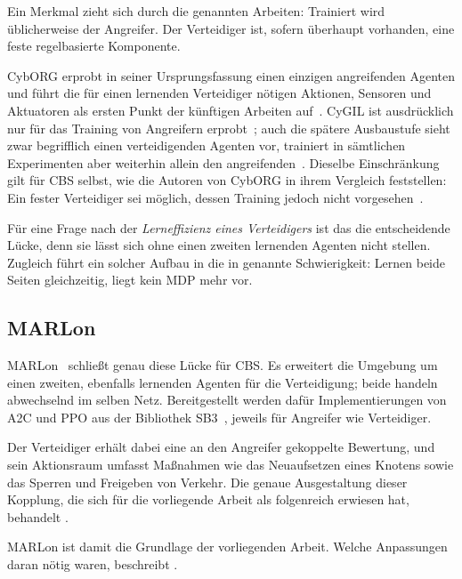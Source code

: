 Ein Merkmal zieht sich durch die genannten Arbeiten: Trainiert wird
üblicherweise der Angreifer. Der Verteidiger ist, sofern überhaupt vorhanden,
eine feste regelbasierte Komponente.

CybORG erprobt in seiner Ursprungsfassung einen einzigen angreifenden Agenten
und führt die für einen lernenden Verteidiger nötigen Aktionen, Sensoren und
Aktuatoren als ersten Punkt der künftigen Arbeiten
auf~\cite{standen2021cyborg}. CyGIL ist ausdrücklich nur für das Training von
Angreifern erprobt~\cite{li2021cygil}; auch die spätere Ausbaustufe sieht zwar
begrifflich einen verteidigenden Agenten vor, trainiert in sämtlichen
Experimenten aber weiterhin allein den angreifenden~\cite{li2023cygilsim}. Dieselbe Einschränkung gilt für \ac{CBS}
selbst, wie die Autoren von CybORG in ihrem Vergleich feststellen: Ein fester
Verteidiger sei möglich, dessen Training jedoch nicht
vorgesehen~\cite{standen2021cyborg}.

Für eine Frage nach der \emph{Lerneffizienz eines Verteidigers} ist das die
entscheidende Lücke, denn sie lässt sich ohne einen zweiten lernenden Agenten
nicht stellen. Zugleich führt ein solcher Aufbau in die in
 genannte Schwierigkeit: Lernen beide Seiten
gleichzeitig, liegt kein \ac{MDP} mehr vor.

\subsection{MARLon}
\label{sec:cbs}

MARLon~\cite{marlon} schließt genau diese Lücke für \ac{CBS}. Es erweitert
die Umgebung um einen zweiten, ebenfalls lernenden Agenten für die Verteidigung;
beide handeln abwechselnd im selben Netz. Bereitgestellt werden dafür
Implementierungen von \ac{A2C} und \ac{PPO} aus der Bibliothek
\ac{SB3}~\cite{stablebaselines3}, jeweils für Angreifer wie Verteidiger.

Der Verteidiger erhält dabei eine an den Angreifer gekoppelte Bewertung, und
sein Aktionsraum umfasst Maßnahmen wie das Neuaufsetzen eines Knotens sowie das
Sperren und Freigeben von Verkehr. Die genaue Ausgestaltung dieser Kopplung, die
sich für die vorliegende Arbeit als folgenreich erwiesen hat, behandelt
.

MARLon ist damit die Grundlage der vorliegenden Arbeit. Welche Anpassungen daran
nötig waren, beschreibt .

